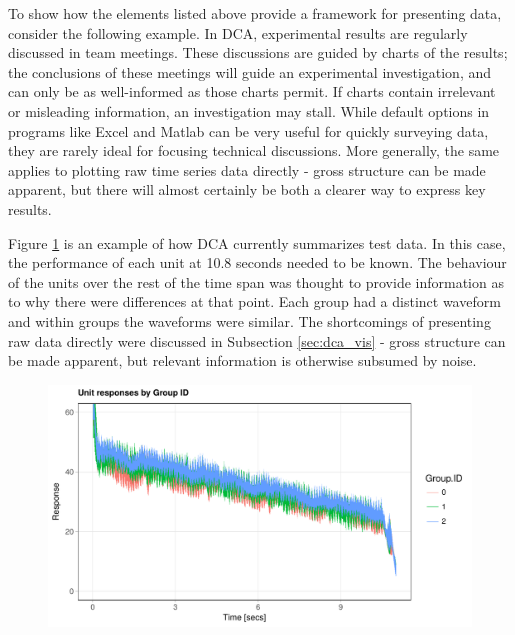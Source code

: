 \documentclass[11pt,a4paper,article]{memoir} %
\begin{document}
To show how the elements listed above provide a framework for presenting data, consider the following example. In DCA, experimental results are regularly discussed in team meetings. These discussions are guided by charts of the results; the conclusions of these meetings will guide an experimental investigation, and can only be as well-informed as those charts permit. If charts contain irrelevant or misleading information, an investigation may stall.
  While default options in programs like Excel and Matlab can be very useful for quickly surveying data, they are rarely ideal for focusing technical discussions. More generally, the same applies to plotting raw time series data directly - gross structure can be made apparent, but there will almost certainly be both a clearer way to express key results.
  
  Figure \ref{fig:imitation_line_chart} is an example of how DCA currently summarizes test data. In this case, the performance of each unit at 10.8 seconds needed to be known. The behaviour of the units over the rest of the time span was thought to provide information as to why there were differences at that point. Each group had a distinct waveform and within groups the waveforms were similar. The shortcomings of presenting raw data directly were discussed in Subsection \ref{sec:dca_vis} - gross structure can be made apparent, but relevant information is otherwise subsumed by noise.
  
   \begin{figure}[h!]
\includegraphics[width=\textwidth]{imitation_line_chart.pdf}
\caption{}
\label{fig:imitation_line_chart}
\end{figure}
  
\end{document}
